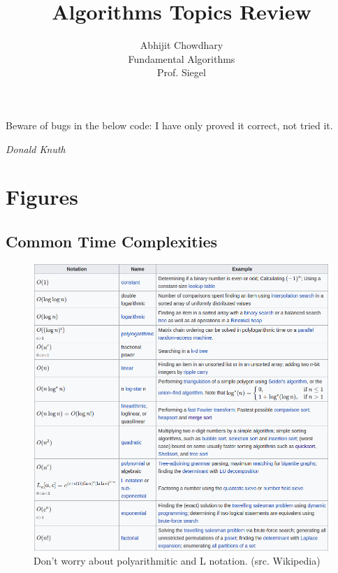 \documentclass[12pt]{article}
\theoremstyle{definition}
\begin{document}
 

 
\title{Algorithms Topics Review}%
\author{Abhijit Chowdhary\\ %
Fundamental Algorithms \\
Prof. Siegel} %

\maketitle

\epigraph{Beware of bugs in the below code: I have only proved it correct, not
tried it.}{\textit{Donald Knuth}}

\tableofcontents
\pagebreak




\section{Figures}

\subsection{Common Time Complexities}
\begin{figure}[H]
\includegraphics[width= \textwidth]{./Images/classes.png}
\caption{Don't worry about polyarithmitic and L notation. (src. Wikipedia)}
\centering
\end{figure}
\end{document}
